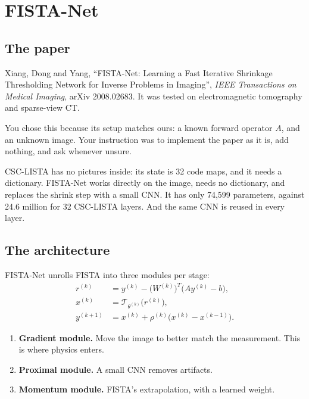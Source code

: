 \chapter{FISTA-Net}\label{ch:fistanet}

\section{The paper}

Xiang, Dong and Yang, ``FISTA-Net: Learning a Fast Iterative Shrinkage Thresholding Network for Inverse
Problems in Imaging'', \emph{IEEE Transactions on Medical Imaging}, arXiv 2008.02683. It was tested on
electromagnetic tomography and sparse-view CT.

You chose this because its setup matches ours: a known forward operator $A$, and an unknown image. Your
instruction was to implement the paper as it is, add nothing, and ask whenever unsure.

\begin{keyidea}
CSC-LISTA has no pictures inside: its state is 32 code maps, and it needs a dictionary. FISTA-Net works
directly on the image, needs no dictionary, and replaces the shrink step with a small CNN. It has only 74,599
parameters, against 24.6 million for 32 CSC-LISTA layers. And the same CNN is reused in every layer.
\end{keyidea}

\section{The architecture}

FISTA-Net unrolls FISTA into three modules per stage:
\begin{align}
r^{(k)} &= y^{(k)} - \big(W^{(k)}\big)^T\big(Ay^{(k)} - b\big), \tag{Eq.~8a}\\
x^{(k)} &= \mathcal{T}_{\theta^{(k)}}\big(r^{(k)}\big), \tag{Eq.~8b}\\
y^{(k+1)} &= x^{(k)} + \rho^{(k)}\big(x^{(k)} - x^{(k-1)}\big). \tag{Eq.~8c}
\end{align}

\begin{enumerate}
\item \textbf{Gradient module.} Move the image to better match the measurement. This is where physics enters.
\item \textbf{Proximal module.} A small CNN removes artifacts.
\item \textbf{Momentum module.} FISTA's extrapolation, with a learned weight.
\end{enumerate}

